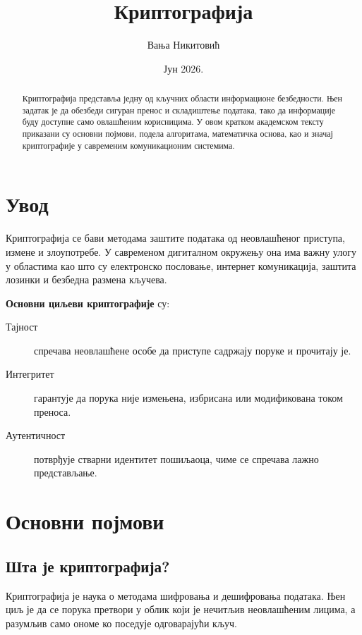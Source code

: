 \documentclass[12pt]{article}
\title{\textbf{Криптографија}}
\author{Вања Никитовић}
\date{Јун 2026.}
\theoremstyle{definition}
\begin{document}
\maketitle

\begin{abstract}
Криптографија представља једну од кључних области информационе безбедности. Њен задатак је да обезбеди сигуран пренос и складиштење података, тако да информације буду доступне само овлашћеним корисницима. У овом кратком академском тексту приказани су основни појмови, подела алгоритама, математичка основа, као и значај криптографије у савременим комуникационим системима.
\end{abstract}

\tableofcontents
\newpage

\section{Увод}

Криптографија се бави методама заштите података од неовлашћеног приступа, измене и злоупотребе. У савременом дигиталном окружењу она има важну улогу у областима као што су електронско пословање, интернет комуникација, заштита лозинки и безбедна размена кључева.

\textbf{Основни циљеви криптографије} су:
\begin{description}
    \item[Тајност] спречава неовлашћене особе да приступе садржају поруке и прочитају је.
    \item[Интегритет] гарантује да порука није измењена, избрисана или модификована током преноса.
    \item[Аутентичност] потврђује стварни идентитет пошиљаоца, чиме се спречава лажно представљање.
\end{description}

\section{Основни појмови}

\subsection{Шта је криптографија?}

\raggedright
Криптографија је наука о методама шифровања и дешифровања података. Њен циљ је да се порука претвори у облик који је нечитљив неовлашћеним лицима, а разумљив само ономе ко поседује одговарајући кључ.
\end{document}
